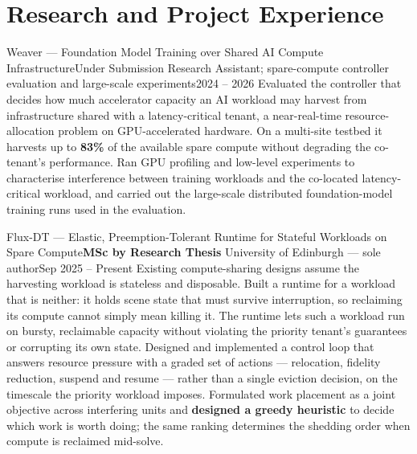 \section{Research and Project Experience}
  \resumeSubHeadingListStart

    \resumeSubheading
      {Weaver --- Foundation Model Training over Shared AI Compute Infrastructure}{Under Submission}
      {Research Assistant; spare-compute controller evaluation and large-scale experiments}{2024 -- 2026}
      \resumeItemListStart
          {Evaluated the controller that decides how much accelerator capacity an AI workload may harvest from infrastructure shared with a latency-critical tenant, a near-real-time resource-allocation problem on GPU-accelerated hardware. On a multi-site testbed it harvests up to \textbf{83\%} of the available spare compute without degrading the co-tenant's performance.}
          {Ran GPU profiling and low-level experiments to characterise interference between training workloads and the co-located latency-critical workload, and carried out the large-scale distributed foundation-model training runs used in the evaluation.}
      \resumeItemListEnd

    \resumeSubheading
      {Flux-DT --- Elastic, Preemption-Tolerant Runtime for Stateful Workloads on Spare Compute}{\textbf{MSc by Research Thesis}}
      {University of Edinburgh --- sole author}{Sep 2025 -- Present}
      \resumeItemListStart
          {Existing compute-sharing designs assume the harvesting workload is stateless and disposable. Built a runtime for a workload that is neither: it holds scene state that must survive interruption, so reclaiming its compute cannot simply mean killing it. The runtime lets such a workload run on bursty, reclaimable capacity without violating the priority tenant's guarantees or corrupting its own state.}
          {Designed and implemented a control loop that answers resource pressure with a graded set of actions --- relocation, fidelity reduction, suspend and resume --- rather than a single eviction decision, on the timescale the priority workload imposes.}
          {Formulated work placement as a joint objective across interfering units and \textbf{designed a greedy heuristic} to decide which work is worth doing; the same ranking determines the shedding order when compute is reclaimed mid-solve.}
      \resumeItemListEnd

